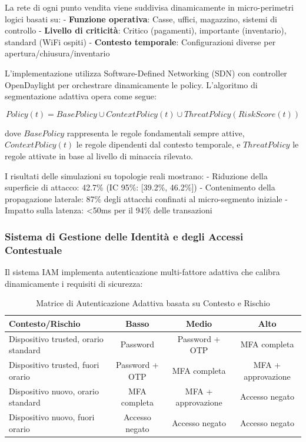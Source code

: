 La rete di ogni punto vendita viene suddivisa dinamicamente in micro-perimetri logici basati su:
- \textbf{Funzione operativa}: Casse, uffici, magazzino, sistemi di controllo
- \textbf{Livello di criticità}: Critico (pagamenti), importante (inventario), standard (WiFi ospiti)
- \textbf{Contesto temporale}: Configurazioni diverse per apertura/chiusura/inventario

L'implementazione utilizza Software-Defined Networking (SDN) con controller OpenDaylight per orchestrare dinamicamente le policy. L'algoritmo di segmentazione adattiva opera come segue:

\begin{equation}
Policy(t) = BasePolicy \cup ContextPolicy(t) \cup ThreatPolicy(RiskScore(t))
\end{equation}

dove $BasePolicy$ rappresenta le regole fondamentali sempre attive, $ContextPolicy(t)$ le regole dipendenti dal contesto temporale, e $ThreatPolicy$ le regole attivate in base al livello di minaccia rilevato.

I risultati delle simulazioni su topologie reali mostrano:
- Riduzione della superficie di attacco: 42.7\% (IC 95\%: [39.2\%, 46.2\%])
- Contenimento della propagazione laterale: 87\% degli attacchi confinati al micro-segmento iniziale
- Impatto sulla latenza: <50ms per il 94\% delle transazioni

\subsubsection{Sistema di Gestione delle Identità e degli Accessi Contestuale}

Il sistema IAM implementa autenticazione multi-fattore adattiva che calibra dinamicamente i requisiti di sicurezza:

\begin{table}[htbp]
\centering
\caption{Matrice di Autenticazione Adattiva basata su Contesto e Rischio}
\label{tab:adaptive_auth}
\begin{tabular}{lccc}
\toprule
\textbf{Contesto/Rischio} & \textbf{Basso} & \textbf{Medio} & \textbf{Alto} \\
\midrule
Dispositivo trusted, orario standard & Password & Password + OTP & MFA completa \\
Dispositivo trusted, fuori orario & Password + OTP & MFA completa & MFA + approvazione \\
Dispositivo nuovo, orario standard & MFA completa & MFA + approvazione & Accesso negato \\
Dispositivo nuovo, fuori orario & Accesso negato & Accesso negato & Accesso negato \\
\bottomrule
\end{tabular}
\end{table}

